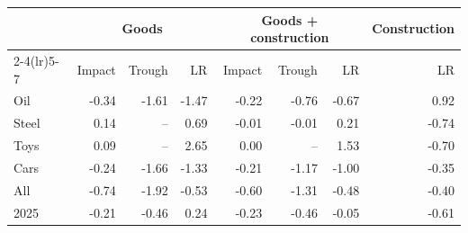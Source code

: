 \begin{tabular}{lrrrrrrr}
\toprule
 & \multicolumn{3}{c}{Goods} & \multicolumn{3}{c}{Goods + construction} & Construction \\
\cmidrule(lr){2-4}\cmidrule(lr){5-7}
 & Impact & Trough & LR & Impact & Trough & LR & LR \\
\midrule
Oil & -0.34 & -1.61 & -1.47 & -0.22 & -0.76 & -0.67 & 0.92 \\
Steel & 0.14 & -- & 0.69 & -0.01 & -0.01 & 0.21 & -0.74 \\
Toys & 0.09 & -- & 2.65 & 0.00 & -- & 1.53 & -0.70 \\
Cars & -0.24 & -1.66 & -1.33 & -0.21 & -1.17 & -1.00 & -0.35 \\
All & -0.74 & -1.92 & -0.53 & -0.60 & -1.31 & -0.48 & -0.40 \\
2025 & -0.21 & -0.46 & 0.24 & -0.23 & -0.46 & -0.05 & -0.61 \\
\bottomrule
\end{tabular}
